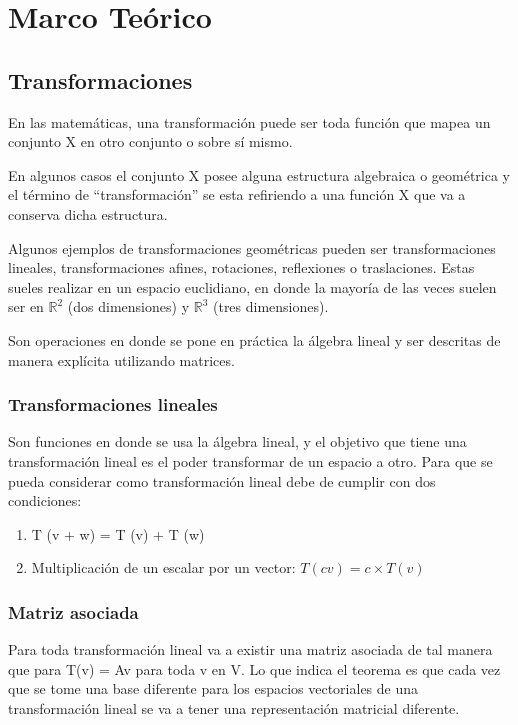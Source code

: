 \documentclass[a4paper]{article}
\begin{document}
\newpage
\section{Marco Teórico}

\subsection{Transformaciones}
En las matemáticas, una transformación puede ser toda función que mapea un conjunto X en otro conjunto o sobre sí mismo.

En algunos casos el conjunto X posee alguna estructura algebraica o geométrica y el término de “transformación” se esta refiriendo a una función X que va a conserva dicha estructura.

Algunos ejemplos de transformaciones geométricas pueden ser transformaciones lineales,  transformaciones afines, rotaciones, reflexiones o traslaciones. Estas sueles realizar en un espacio euclidiano, en donde la mayoría de las veces suelen ser en $\mathbb{R}^2$ (dos dimensiones) y $\mathbb{R}^3$ (tres dimensiones).

Son operaciones en donde se pone en práctica la álgebra lineal y ser descritas de manera explícita utilizando matrices.

\subsubsection{Transformaciones lineales}
Son funciones en donde se usa la álgebra lineal, y el objetivo que tiene una transformación lineal es el poder transformar de un espacio a otro.
Para que se pueda considerar como transformación lineal debe de cumplir con dos condiciones:
\begin{enumerate}
    \item T (v + w) = T (v) + T (w)
    \item Multiplicación de un escalar por un vector: $T (cv) = c \times T (v)$
\end{enumerate}


\subsubsection{Matriz asociada}
Para toda transformación lineal va a existir una matriz asociada de tal manera que para T(v) = Av para toda v en V.
Lo que indica el teorema es que cada vez que se tome una base diferente para los espacios vectoriales de una transformación lineal se va a tener una representación matricial diferente.
\end{document}
